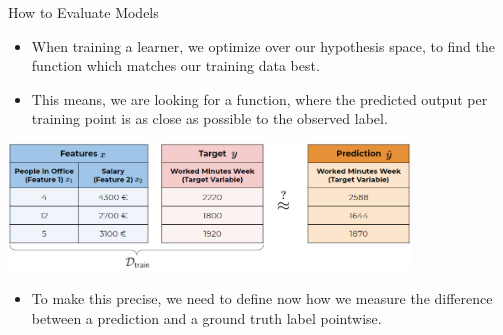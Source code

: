 \documentclass[11pt,compress,t,notes=noshow, xcolor=table]{beamer}
\begin{document}
\begin{vbframe}{How to Evaluate Models}

\begin{itemize}
\item When training a learner, we optimize over our hypothesis space,
    to find the function which matches our training data best.
\item This means, we are looking for a function, where the
    predicted output per training point is as close as possible to
    the observed label.
\end{itemize}





\begin{center}\includegraphics[width=0.8\textwidth]{figure_man/ml-basics-riskmin-eval.png} \end{center}
\begin{itemize}
    \item To make this precise, we need to define now how we measure the difference
        between a prediction and a ground truth label pointwise.
  \end{itemize}

\end{vbframe}
\end{document}
